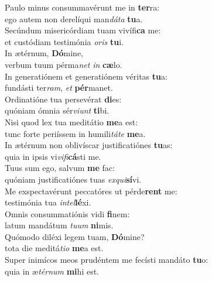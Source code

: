 \oddverse Paulo minus consummavérunt me in \textbf{ter}ra:~\*\\
\oddverse ego autem non derelíqui man\textit{dá}\textit{ta} \textbf{tu}a.\\
\evenverse Secúndum misericórdiam tuam vivífi\textbf{ca} me:~\*\\
\evenverse et custódiam testimónia \textit{o}\textit{ris} \textbf{tu}i.\\
\oddverse In ætérnum, \textbf{Dó}mine,~\*\\
\oddverse verbum tuum pérma\textit{net} \textit{in} \textbf{cæ}lo.\\
\evenverse In generatiónem et generatiónem véritas \textbf{tu}a:~\*\\
\evenverse fundásti ter\textit{ram}, \textit{et} \textbf{pér}manet.\\
\oddverse Ordinatióne tua persevérat \textbf{di}es:~\*\\
\oddverse quóniam ómnia sér\textit{vi}\textit{unt} \textbf{ti}bi.\\
\evenverse Nisi quod lex tua meditátio \textbf{me}a est:~\*\\
\evenverse tunc forte periíssem in humili\textit{tá}\textit{te} \textbf{me}a.\\
\oddverse In ætérnum non oblivíscar justificatiónes \textbf{tu}as:~\*\\
\oddverse quia in ipsis vi\textit{vi}\textit{fi}\textbf{cá}sti me.\\
\evenverse Tuus sum ego, salvum \textbf{me} fac:~\*\\
\evenverse quóniam justificatiónes tuas \textit{ex}\textit{qui}\textbf{sí}vi.\\
\oddverse Me exspectavérunt peccatóres ut pérde\textbf{rent} me:~\*\\
\oddverse testimónia tua \textit{in}\textit{tel}\textbf{lé}xi.\\
\evenverse Omnis consummatiónis vidi \textbf{fi}nem:~\*\\
\evenverse latum mandátum \textit{tu}\textit{um} \textbf{ni}mis.\\
\oddverse Quómodo diléxi legem tuam, \textbf{Dó}mine?~\*\\
\oddverse tota die meditá\textit{ti}\textit{o} \textbf{me}a est.\\
\evenverse Super inimícos meos prudéntem me fecísti mandáto \textbf{tu}o:~\*\\
\evenverse quia in æ\textit{tér}\textit{num} \textbf{mi}hi est.\\
